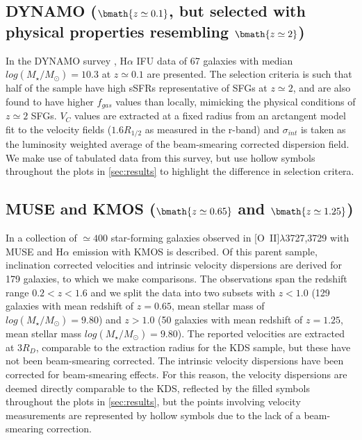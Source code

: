 \documentclass[fleqn,usenatbib]{mnras}
\begin{document}
\subsection{DYNAMO ($\bmath{z\simeq0.1}$, but selected with physical properties resembling $\bmath{z\simeq2}$)}\label{subsec:DYNAMO}
In the DYNAMO survey \citep[G14]{Green2014}, H$\alpha$ IFU data of 67 galaxies with median $log(M_{\star}/M_{\odot})=10.3$ at $z\simeq0.1$ are presented.
The selection criteria is such that half of the sample have high sSFRs representative of SFGs at $z\simeq2$, and are also found to have higher $f_{gas}$ values than locally, mimicking the physical conditions of $z\simeq2$ SFGs.
$V_{C}$ values are extracted at a fixed radius from an arctangent model fit to the velocity fields ($1.6R_{1/2}$ as measured in the r-band) and $\sigma_{int}$ is taken as the luminosity weighted average of the beam-smearing corrected dispersion field.
We make use of tabulated data from this survey, but use hollow symbols throughout the plots in \cref{sec:results} to highlight the difference in selection critera.

\subsection{MUSE and KMOS ($\bmath{z\simeq0.65}$ and $\bmath{z\simeq1.25}$)}\label{subsec:MUSE_and_KMOS}
In \cite{Swinbank2017} a collection of $\simeq400$ star-forming galaxies observed in [O~{\sc II}]$\lambda$3727,3729 with MUSE and H$\alpha$ emission with KMOS is described.
Of this parent sample, inclination corrected velocities and intrinsic velocity dispersions are derived for 179 galaxies, to which we make comparisons.
The observations span the redshift range $0.2 < z < 1.6$ and we split the data into two subsets with $z < 1.0$ (129 galaxies with mean redshift of $z = 0.65$, mean stellar mass of $log(M_{\star}/M_{\odot})=9.80$) and $z > 1.0$ (50 galaxies with mean redshift of $z = 1.25$, mean stellar mass $log(M_{\star}/M_{\odot})=9.80$).
The reported velocities are extracted at $3R_{D}$, comparable to the extraction radius for the KDS sample, but these have not been beam-smearing corrected.
The intrinsic velocity dispersions have been corrected for beam-smearing effects.
For this reason, the velocity dispersions are deemed directly comparable to the KDS, reflected by the filled symbols throughout the plots in \cref{sec:results}, but the points involving velocity measurements are represented by hollow symbols due to the lack of a beam-smearing correction.
\end{document}
